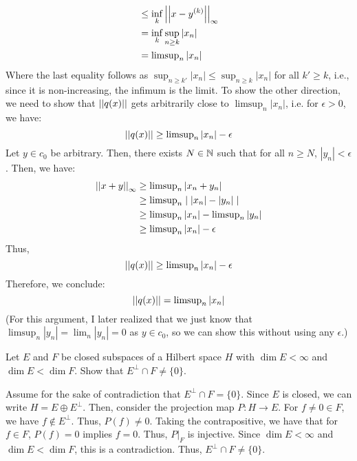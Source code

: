 \documentclass[12pt]{article}
\begin{document}
\begin{solution}
\begin{enumerate}
\begin{align*}
            &\leq \inf_k \left\vert\left\vert x-y^{(k)}\right\vert\right\vert_\infty \\
            &= \inf_k \sup_{n \geq k} |x_n| \\
            &= \operatorname{limsup}_n |x_n|
        \end{align*}
        Where the last equality follows as $\sup_{n \geq k'} |x_n| \leq \sup_{n \geq k} |x_n|$ for all $k' \geq k$, i.e., since it is non-increasing, the infimum is the limit. \bbni
        To show the other direction, we need to show that $\left\vert\left\vert q(x)\right\vert\right\vert$ gets arbitrarily close to $\limsup_n |x_n|$, i.e. for $\epsilon > 0$, we have: 
        \[ \left\vert\left\vert q(x)\right\vert\right\vert \geq \operatorname{limsup}_n |x_n| - \epsilon\]
        Let $y \in c_0$ be arbitrary. Then, there exists $N \in \mathbb N$ such that for all $n \geq N$, $|y_n| < \epsilon$. Then, we have:
        \begin{align*}
            \left\vert\left\vert x+y\right\vert\right\vert_\infty &\geq \operatorname{limsup}_n |x_n + y_n| \\
            &\geq \operatorname{limsup}_n \mid |x_n| - |y_n|\mid \\
            &\geq \operatorname{limsup}_n |x_n| - \operatorname{limsup}_n |y_n| \\
            &\geq \operatorname{limsup}_n |x_n| - \epsilon
        \end{align*}
        Thus,
        \[ \left\vert\left\vert q(x)\right\vert\right\vert \geq \operatorname{limsup}_n |x_n| - \epsilon\]
        Therefore, we conclude:
        \[ \left\vert\left\vert q(x)\right\vert\right\vert = \operatorname{limsup}_n |x_n|\]
        (For this argument, I later realized that we just know that $\limsup_n |y_n| = \lim_n |y_n| = 0$ as $y \in c_0$, so we can show this without using any $\epsilon$.)
    \end{enumerate}
\end{solution}
\newpage

\begin{problem}{5}
    Let $E$ and $F$ be closed subspaces of a Hilbert space $H$ with $\dim E < \infty$ and $\dim E < \dim F$. Show that $E^\perp \cap F \neq \{0\}$.
\end{problem}
\begin{solution}
    Assume for the sake of contradiction that $E^\perp \cap F = \{0\}$. Since $E$ is closed, we can write $H = E \oplus E^\perp$. Then, consider the projection map $P : H \to E$. For $f \neq 0 \in F$, we have $f \not\in E^\perp$. Thus, $P(f) \neq 0$. \bbni  
    Taking the contrapositive, we have that for $f \in F$, $P(f) = 0$ implies $f = 0$. Thus, $P|_F$ is injective. Since $\dim E < \infty$ and $\dim E < \dim F$, this is a contradiction. Thus, $E^\perp \cap F \neq \{0\}$.
\end{solution}
\newpage
\end{document}
